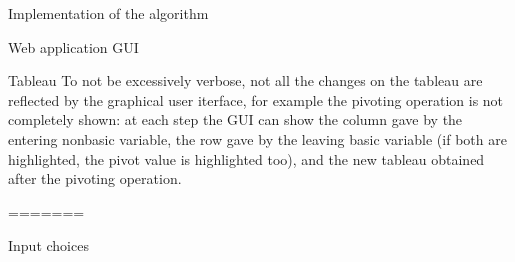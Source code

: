 \documentclass[9pt]{extarticle}
\begin{document}
\begin{section}{Implementation of the algorithm}
\begin{subsection}{Web application GUI}
\begin{subsubsection}{Tableau}
                To not be excessively verbose, not all the changes on the tableau are reflected by the graphical user iterface, for example
                the pivoting operation is not completely shown: at each step the GUI can show the column gave by the entering nonbasic variable,
                the row gave by the leaving basic variable (if both are highlighted, the pivot value is highlighted too), and the new tableau obtained
                after the pivoting operation.
            \end{subsubsection}
=======
            

            \begin{subsubsection}{Input choices}
                


\end{subsubsection}
\end{subsection}
\end{section}
\end{document}
